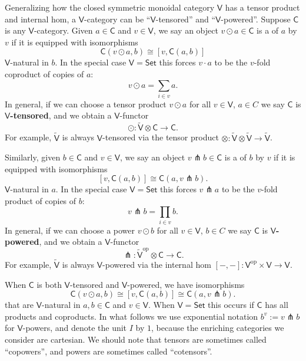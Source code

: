 \documentclass{amsart}
\newcommand{\define}[1]{{\bf \boldmath{#1}}}
\theoremstyle{definition}
\newcommand{\Set}{\mathsf{Set}}
\newcommand{\V}{\mathsf{V}}
\newcommand{\C}{\mathsf{C}}
\newcommand{\op}{\mathrm{op}}
\newcommand{\pfk}{\pitchfork}
\newcommand{\maps}{\colon}
\begin{document}
Generalizing how the closed symmetric monoidal category $\V$ has a tensor product and internal hom, a $\V$-category can be ``$\V$-tensored'' and ``$\V$-powered''.   
Suppose $\C$ is any $\V$-category.  Given $a \in \C$ and $v \in \V$, we say an object 
$v \odot a \in \C$ is a \define{tensor product} of $a$ by $v$ if it is equipped with isomorphisms
\begin{equation}\label{eq:tensor}
	\C(v\odot a,b) \cong \left[v, \C(a,b)\right]
\end{equation}
$\V$-natural in $b$.
In the special case $\V = \Set$ this forces $v \cdot a$ to be the $v$-fold coproduct 
of copies of $a$:
\[       v \odot a = \sum_{i \in v} a . \]
In general, if we can choose a tensor product $v \odot a$ for all $v \in \V$, $a \in C$
we say $\C$ is \textbf{$\V$-tensored}, and we obtain a $\V$-functor
\[
	\odot \maps \tilde{\V} \otimes \C \to \C.
\]
For example, $\tilde{\V}$ is always $\V$-tensored via the tensor product
$ \otimes \maps \tilde{\V} \otimes \tilde{\V} \to \tilde{\V} $.

Similarly, given $b \in \C$ and $v \in \V$, we say an object $v \pfk b \in \C$ is a \define{power} of $b$ by $v$ if it is equipped with isomorphisms
\begin{equation}\label{eq:power}
		 \left[v, \C(a,b)\right] \cong \C(a,v\pfk b) .
\end{equation}
$\V$-natural in $a$.  In the special case $\V = \Set$  this forces $v \pfk a$ to be the $v$-fold product of copies of $b$:
\[          v \pfk b = \prod_{i \in v} b . \]
In general, if we can choose a power $v \odot b$ for all $v \in \V$, $b \in C$
we say $\C$ is \textbf{$\V$-powered}, and we obtain a $\V$-functor
\[
\pfk \maps \tilde{\V}^\op \otimes \C \to \C .
\]
For example, $\tilde{\V}$ is always $\V$-powered via the internal hom
$[-,-] \maps \V^\op \times \V \to \V $.

When $\C$ is both $\V$-tensored and $\V$-powered, we have isomorphisms
\begin{equation}\label{eq:co-power}
	\C(v\odot a,b) \cong \left[v, \C(a,b)\right] \cong \C(a,v \pfk b).
\end{equation}
that are  $\V$-natural in $a,b \in \C$ and $v \in \V$.  When $\V = \Set$ this occurs if $\C$ has all products and coproducts.    In what follows we use exponential notation $b^v := v\pfk b$ for $\V$-powers, and denote the unit $I$ by $1$, because the enriching categories we consider are cartesian.  We should note that tensors are sometimes called ``copowers'', and powers are sometimes called ``cotensors''.
\end{document}
